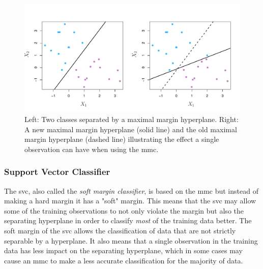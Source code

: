 \documentclass[11pt]{article}
\begin{document}
\begin{figure}[ht]
  \centering
  \includegraphics[width=12cm]{graphics/9_5.pdf}
  \caption{Left: Two classes separated by a maximal margin hyperplane. Right: A new maximal margin hyperplane (solid line) and the old maximal margin hyperplane (dashed line) illustrating the effect a single observation can have when using the \gls{mmc}.\cite{jamesSupportVectorMachines}}
\end{figure}

\subsubsection{Support Vector Classifier}
The \gls{svc}, also called the \textit{soft margin classifier}, is based on the \gls{mmc} but instead of making a hard margin it has a "soft" margin. This means that the \gls{svc} may allow some of the training observations to not only violate the margin but also the separating hyperplane in order to classify \textit{most} of the training data better. The soft margin of the \gls{svc} allows the classification of data that are not strictly separable by a hyperplane. It also means that a single observation in the training data has less impact on the separating hyperplane, which in some cases may cause an \gls{mmc} to make a less accurate classification for the majority of data.\cite{jamesSupportVectorMachines}
\end{document}

